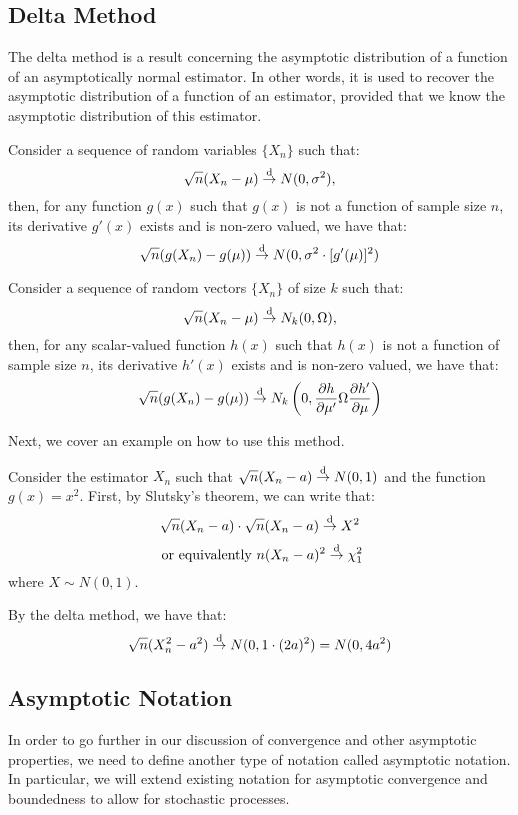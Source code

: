 \subsection{Delta Method}

The delta method is a result concerning the asymptotic distribution of a function of an asymptotically normal estimator. In other words, it is used to recover the asymptotic distribution of a function of an estimator, provided that we know the asymptotic distribution of this estimator.

\begin{proposition}
Consider a sequence of random variables $\{X_n\}$ such that: $$\sqrt{n}(X_n - \mu) \overset{\text{d}}{\to} N(0, \sigma^2), $$
then, for any function $g(x)$ such that $g(x)$ is not a function of sample size $n$, its derivative $g'(x)$ exists and is non-zero valued, we have that: $$\sqrt{n}(g(X_n) - g(\mu)) \overset{\text{d}}{\to} N(0, \sigma^2\cdot [g'(\mu)]^2) $$
\end{proposition}

\begin{proposition}
Consider a sequence of random vectors $\{X_n\}$ of size $k$ such that: $$\sqrt{n}(X_n - \mu) \overset{\text{d}}{\to} N_k(0, \Omega), $$
then, for any scalar-valued function $h(x)$ such that $h(x)$ is not a function of sample size $n$, its derivative $h'(x)$ exists and is non-zero valued, we have that: $$\sqrt{n}(g(X_n) - g(\mu)) \overset{\text{d}}{\to} N_k\left(0, \frac{\partial h}{\partial \mu'}\Omega\frac{\partial h'}{\partial \mu}\right) $$
\end{proposition}

Next, we cover an example on how to use this method.

Consider the estimator $X_n$ such that $\sqrt{n}(X_n - a) \overset{\text{d}}{\to} N(0, 1)$ and the function $g(x) = x^2$. First, by Slutsky's theorem, we can write that: $$\sqrt{n}(X_n - a) \cdot \sqrt{n}(X_n - a) \overset{\text{d}}{\to} X^2 $$ $$\text{ or equivalently } n(X_n - a)^2 \overset{\text{d}}{\to} \chi_1^2 $$ where $X\sim N(0,1)$.

By the delta method, we have that: $$\sqrt{n}(X_n^2 - a^2)\overset{\text{d}}{\to} N(0, 1 \cdot (2a)^2) = N(0, 4a^2) $$ 


\subsection{Asymptotic Notation}

In order to go further in our discussion of convergence and other asymptotic properties, we need to define another type of notation called asymptotic notation. In particular, we will extend existing notation for asymptotic convergence and boundedness to allow for stochastic processes.

